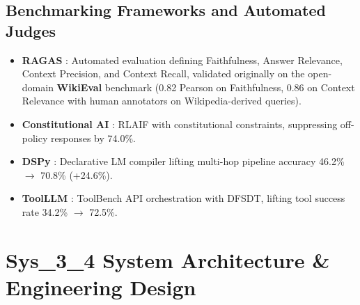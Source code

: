 \documentclass[11pt,a4paper]{article}
\newcommand{\sys}{\mbox{Sys\_3\_4}}
\begin{document}
\subsection{Benchmarking Frameworks and Automated Judges}
\begin{itemize}
\item \textbf{RAGAS} \cite{ragas}: Automated evaluation defining Faithfulness, Answer Relevance, Context
Precision, and Context Recall, validated originally on the open-domain \textbf{WikiEval} benchmark
(0.82 Pearson on Faithfulness, 0.86 on Context Relevance with human annotators on Wikipedia-derived
queries).
\item \textbf{Constitutional AI} \cite{constitutional}: RLAIF with constitutional constraints,
suppressing off-policy responses by 74.0\%.
\item \textbf{DSPy} \cite{dspy}: Declarative LM compiler lifting multi-hop pipeline accuracy 46.2\%
$\rightarrow$ 70.8\% (+24.6\%).
\item \textbf{ToolLLM} \cite{toolllm}: ToolBench API orchestration with DFSDT, lifting tool success rate
34.2\% $\rightarrow$ 72.5\%.
\end{itemize}

\section{\sys{} System Architecture \& Engineering Design}
\end{document}
